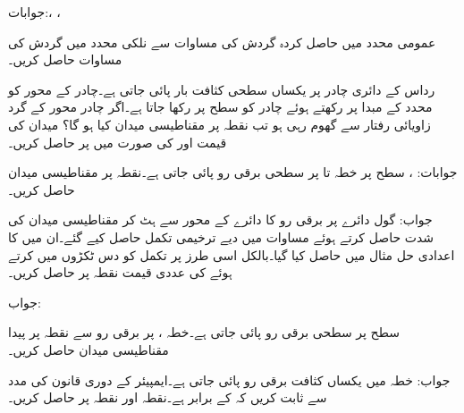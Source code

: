 جوابات:، ، 

عمومی محدد میں حاصل کردہ گردش کی مساوات سے نلکی محدد میں گردش کی مساوات حاصل کریں۔

رداس  کے دائری چادر پر یکساں سطحی کثافت بار  پائی جاتی ہے۔چادر کے محور کو محدد کے مبدا پر رکھتے ہوئے چادر کو سطح  پر رکھا جاتا ہے۔اگر چادر محور کے گرد زاویائی رفتار  سے گھوم رہی ہو تب نقطہ  پر مقناطیسی میدان  کیا ہو گا؟ میدان کی قیمت  اور  کی صورت میں  پر حاصل کریں۔

جوابات: ، 
سطح  پر خطہ  تا  پر سطحی برقی رو  پائی جاتی ہے۔نقطہ  پر مقناطیسی میدان حاصل کریں۔

جواب:
گول دائرے پر برقی رو کا دائرے کے محور سے ہٹ کر مقناطیسی میدان کی شدت حاصل کرتے ہوئے مساوات  میں دیے ترخیمی تکمل حاصل کیے گئے۔ان میں  کا اعدادی حل مثال  میں حاصل کیا گیا۔بالکل اسی طرز پر تکمل کو دس ٹکڑوں میں کرتے ہوئے   کی عددی قیمت نقطہ  پر حاصل کریں۔

جواب:

سطح  پر سطحی برقی رو  پائی جاتی ہے۔خطہ ،  پر برقی رو سے نقطہ  پر پیدا مقناطیسی میدان  حاصل کریں۔

جواب: 
خطہ  میں یکساں کثافت برقی رو  پائی جاتی ہے۔ایمپیئر  کے دوری قانون کی مدد سے ثابت کریں کہ  کے برابر ہے۔نقطہ  اور نقطہ  پر  حاصل کریں۔

